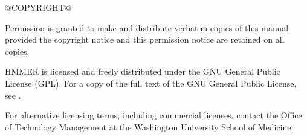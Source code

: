 \vspace*{\fill}
\begin{flushleft}
@COPYRIGHT@

\vspace{5mm}
Permission is granted to make and distribute verbatim copies of this
manual provided the copyright notice and this permission notice are
retained on all copies.

\vspace{5mm}
HMMER is licensed and freely distributed under the GNU General Public
License (GPL). For a copy of the full text of the GNU General Public
License, see
.

\vspace{5mm}
For alternative licensing terms, including commercial licenses,
contact the Office of Technology Management at the Washington
University School of Medicine.

\vspace{5mm}
\end{flushleft}


